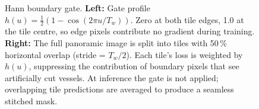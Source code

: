 \documentclass[11pt,letterpaper]{article}
\begin{document}
\begin{figure}[htbp]
\begin{minipage}[t]{0.46\linewidth}
\end{minipage}
\caption{Hann boundary gate. \textbf{Left:} Gate profile $h(u)=\tfrac{1}{2}(1-\cos(2\pi u/T_w))$. Zero at both tile edges, 1.0 at the tile centre, so edge pixels contribute no gradient during training. \textbf{Right:} The full panoramic image is split into tiles with 50\,\% horizontal overlap (stride = $T_w/2$). Each tile's loss is weighted by $h(u)$, suppressing the contribution of boundary pixels that see artificially cut vessels. At inference the gate is not applied; overlapping tile predictions are averaged to produce a seamless stitched mask.}
\label{fig:hann-gate}
\end{figure}
\end{document}
